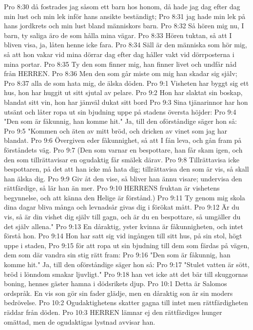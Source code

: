 Pro 8:30  då fostrades jag såsom ett barn hos honom, då hade jag dag efter dag min lust och min lek inför hans ansikte beständigt;
Pro 8:31  jag hade min lek på hans jordkrets och min lust bland människors barn.
Pro 8:32  Så hören mig nu, I barn, ty saliga äro de som hålla mina vägar.
Pro 8:33  Hören tuktan, så att I bliven visa, ja, låten henne icke fara.
Pro 8:34  Säll är den människa som hör mig, så att hon vakar vid mina dörrar dag efter dag håller vakt vid dörrposterna i mina portar.
Pro 8:35  Ty den som finner mig, han finner livet och undfår nåd från HERREN.
Pro 8:36  Men den som går miste om mig han skadar sig själv;
Pro 8:37  alla de som hata mig, de älska döden.
Pro 9:1  Visheten har byggt sig ett hus, hon har huggit ut sitt sjutal av pelare.
Pro 9:2  Hon har slaktat sin boskap, blandat sitt vin, hon har jämväl dukat sitt bord
Pro 9:3  Sina tjänarinnor har hon utsänt och låter ropa ut sin bjudning uppe på stadens översta höjder:
Pro 9:4  "Den som är fåkunnig, han komme hit." Ja, till den oförståndige säger hon så:
Pro 9:5  "Kommen och äten av mitt bröd, och dricken av vinet som jag har blandat.
Pro 9:6  Övergiven eder fåkunnighet, så att I fån leva, och gån fram på förståndets väg.
Pro 9:7  (Den som varnar en bespottare, han får skam igen, och den som tillrättavisar en ogudaktig får smälek därav.
Pro 9:8  Tillrättavisa icke bespottaren, på det att han icke må hata dig; tillrättavisa den som är vis, så skall han älska dig.
Pro 9:9  Giv åt den vise, så bliver han ännu visare; undervisa den rättfärdige, så lär han än mer.
Pro 9:10  HERRENS fruktan är vishetens begynnelse, och att känna den Helige är förstånd.)
Pro 9:11  Ty genom mig skola dina dagar bliva många och levnadsår givas dig i förökat mått.
Pro 9:12  Är du vis, så är din vishet dig själv till gagn, och är du en bespottare, så umgäller du det själv allena."
Pro 9:13  En dåraktig, yster kvinna är fåkunnigheten, och intet förstå hon.
Pro 9:14  Hon har satt sig vid ingången till sitt hus, på sin stol, högt uppe i staden,
Pro 9:15  för att ropa ut sin bjudning till dem som färdas på vägen, dem som där vandra sin stig rätt fram:
Pro 9:16  "Den som är fåkunnig, han komme hit." Ja, till den oförståndige säger hon så:
Pro 9:17  "Stulet vatten är sött, bröd i lönndom smakar ljuvligt."
Pro 9:18  han vet icke att det bär till skuggornas boning, hennes gäster hamna i dödsrikets djup.
Pro 10:1  Detta är Salomos ordspråk. En vis son gör sin fader glädje, men en dåraktig son är sin moders bedrövelse.
Pro 10:2  Ogudaktighetens skatter gagna till intet men rättfärdigheten räddar från döden.
Pro 10:3  HERREN lämnar ej den rättfärdiges hunger omättad, men de ogudaktigas lystnad avvisar han.
